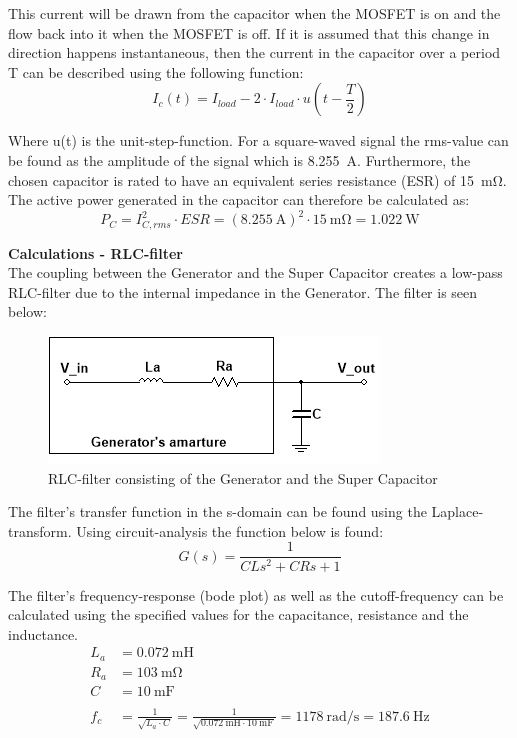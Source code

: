 This current will be drawn from the capacitor when the MOSFET is on and the flow back into it when the MOSFET is off. If it is assumed that this change in direction happens instantaneous, then the current in the capacitor over a period T can be described using the following function:
\begin{equation}
	I_c(t) = I_{load} - 2 \cdot I_{load} \cdot u \left( t - \frac{T}{2} \right)
\end{equation}

Where u(t) is the unit-step-function. For a square-waved signal the rms-value can be found as the amplitude of the signal which is \SI{8.255}{\ampere}. Furthermore, the chosen capacitor is rated to have an equivalent series resistance (ESR) of \SI{15}{\milli \ohm}. The active power generated in the capacitor can therefore be calculated as:
\begin{equation}
	P_C = I_{C,rms}^2 \cdot ESR = (\SI{8.255}{\ampere})^2 \cdot \SI{15}{\milli \ohm} = \SI{1.022}{\watt}
\end{equation}

\textbf{Calculations - RLC-filter}\\
The coupling between the Generator and the Super Capacitor creates a low-pass RLC-filter due to the internal impedance in the Generator\cite{Maxon}. The filter is seen below:

\begin{figure}[H]
	\centering
	\includegraphics[width=0.5\linewidth]{Hardware/LoadSystem/RLC_filter}
	\caption{RLC-filter consisting of the Generator and the Super Capacitor}
	\label{fig:RLC_filter}
\end{figure}

The filter's transfer function in the s-domain can be found using the Laplace-transform. Using circuit-analysis the function below is found: 
\begin{equation}
	G(s) = \frac{1}{CLs^2 + CRs + 1}
\end{equation}

 The filter's frequency-response (bode plot) as well as the cutoff-frequency can be calculated using the specified values for the capacitance, resistance and the inductance.
\begin{equation}
	\begin{split}
		L_a &= \SI{0.072}{\milli \henry}\\
		R_a &= \SI{103}{\milli \ohm}\\
		C &= \SI{10}{\milli \farad}\\
		\\
		f_c &= \frac{1}{\sqrt{L_a \cdot C}} = \frac{1}{\sqrt{\SI{0.072}{\milli \henry} \cdot \SI{10}{\milli \farad}}} = \SI[per-mode=fraction]{1178}{\radian \per \second} = \SI{187.6}{\hertz}
	\end{split}
\end{equation}

